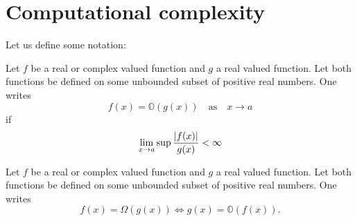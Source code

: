 \section{Computational complexity}
Let us define some notation:
\begin{defn}
   Let $f$ be a real or complex valued function and $g$ a real valued function. Let both functions be defined on some unbounded subset of positive real numbers. One writes
   \begin{equation*}
       f(x) = \mathbb{O}(g(x)) \quad \text{as} \quad x \rightarrow a
   \end{equation*}
   if 
   \begin{equation*}
      \lim_{x \to a} \sup{\frac{\lvert f(x)\rvert}{g(x)}} < \infty
   \end{equation*}
   \end{defn}
   \begin{defn}
      Let $f$ be a real or complex valued function and $g$ a real valued function. Let both functions be defined on some unbounded subset of positive real numbers. One writes
   \begin{equation*}
       f(x) = \Omega(g(x))
    \Longleftrightarrow
      g(x) = \mathbb{O}(f(x)).
   \end{equation*}
   \end{defn}
   

